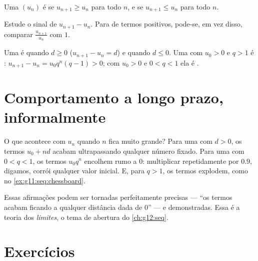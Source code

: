 \begin{definition}\label{def:g11:seq:monotone}
Uma  $(u_n)$ é \emph{} se $u_{n+1} \geq u_n$ para todo
$n$, e \emph{} se $u_{n+1} \leq u_n$ para todo $n$.
\end{definition}

\begin{method}\label{met:g11:seq:monotonicity}
Estude o sinal de $u_{n+1} - u_n$. Para  de termos positivos,
pode-se, em vez disso, comparar $\frac{u_{n+1}}{u_n}$ com $1$.
\end{method}

\begin{example}
Uma  é  quando $d \geq 0$
($u_{n+1} - u_n = d$) e  quando $d \leq 0$. Uma  com $u_0 > 0$ e $q > 1$ é :
$u_{n+1} - u_n = u_0 q^n (q - 1) > 0$; com $u_0 > 0$ e $0 < q < 1$ ela é
.
\end{example}

\section{Comportamento a longo prazo, informalmente}

O que acontece com $u_n$ quando $n$ fica muito grande? Para uma
 com $d > 0$, os termos $u_0 + nd$ acabam
ultrapassando qualquer número fixado. Para uma  com
$0 < q < 1$, os termos $u_0 q^n$ encolhem rumo a $0$: multiplicar
repetidamente por $0.9$, digamos, corrói qualquer valor inicial. E, para
$q > 1$, os termos explodem, como no \cref{ex:g11:seq:chessboard}.

\begin{remark}
Essas afirmações podem ser tornadas perfeitamente precisas --- ``os
termos acabam ficando a qualquer distância dada de $0$'' --- e
demonstradas. Essa é a teoria dos \emph{limites}, o tema de abertura do
\cref{ch:g12:seq}.
\end{remark}

\section{Exercícios}

